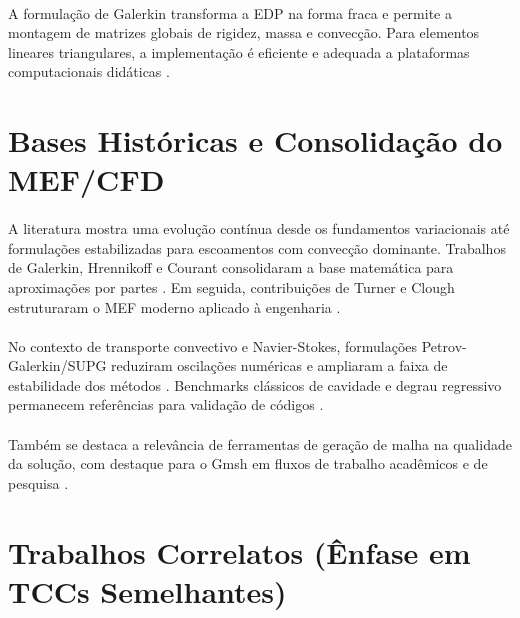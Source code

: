\paragraph{}A formulação de Galerkin transforma a EDP na forma fraca e permite a montagem de matrizes globais de rigidez, massa e convecção. Para elementos lineares triangulares, a implementação é eficiente e adequada a plataformas computacionais didáticas \cite{Reddy2005,Zienkiewicz2013,Fish2007}.

\section{Bases Históricas e Consolidação do MEF/CFD}

\paragraph{}A literatura mostra uma evolução contínua desde os fundamentos variacionais até formulações estabilizadas para escoamentos com convecção dominante. Trabalhos de Galerkin, Hrennikoff e Courant consolidaram a base matemática para aproximações por partes \cite{Galerkin1915,Hrennikoff1941,Courant1943}. Em seguida, contribuições de Turner e Clough estruturaram o MEF moderno aplicado à engenharia \cite{Turner1956,Clough1960}.

\paragraph{}No contexto de transporte convectivo e Navier-Stokes, formulações Petrov-Galerkin/SUPG reduziram oscilações numéricas e ampliaram a faixa de estabilidade dos métodos \cite{Brooks1982,Donea1984,Christie1976,Lohner1984}. Benchmarks clássicos de cavidade e degrau regressivo permanecem referências para validação de códigos \cite{Ghia1982,Marchi2009,Thomas1981,Armaly1983,Pironneau1982}.

\paragraph{}Também se destaca a relevância de ferramentas de geração de malha na qualidade da solução, com destaque para o Gmsh em fluxos de trabalho acadêmicos e de pesquisa \cite{Geuzaine2009}.

\section{Trabalhos Correlatos (Ênfase em TCCs Semelhantes)}

